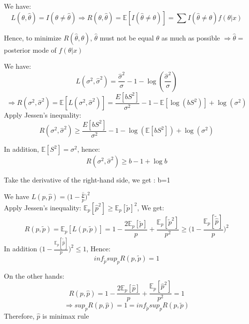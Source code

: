 \documentclass[10pt]{article}
\newenvironment{problem}[2][Problem]{\begin{trivlist}
\item[\hskip \labelsep {\bfseries #1}\hskip \labelsep {\bfseries #2.}]}{\end{trivlist}}
\begin{document}
\begin{problem}{3}
 
We have:
\[L(\theta, \hat{\theta})= I(\theta \neq \hat{\theta}) \Rightarrow R(\theta, \hat{\theta})= \mathbb{E}[I(\hat{\theta} \neq \theta)]= \sum I(\hat{\theta} \neq \theta)f(\theta | x)\]

Hence, to minimize $R(\hat{\theta}, \theta)$,  $\hat{\theta} $ must not be equal $\theta$ as much as possible $\Rightarrow \hat{\theta}=$ posterior mode of $f(\theta| x)$ 


\end{problem}

\begin{problem}{4}


We have:
\[L(\sigma ^2, \hat{\sigma} ^2)=\frac{\hat{\sigma} ^2}{\sigma} -1- \log(\frac{\hat{\sigma} ^2}{\sigma})\]
\[\Rightarrow R(\sigma ^2, \hat{\sigma} ^2)= \mathbb{E}[L(\sigma ^2, \hat{\sigma} ^2)]=\frac{E[bS^2]}{\sigma ^2}-1-\mathbb{E}[\log (bS^2)]+ \log(\sigma ^2)\]
Apply Jessen's inequality:
\[R(\sigma ^2, \hat{\sigma} ^2) \geq \frac{E[bS^2]}{\sigma ^2}-1-\log (\mathbb{E}[bS^2] )+ \log(\sigma ^2)\]

In addition, $\mathbb{E}[S^2]= \sigma ^2$, hence:
\[R(\sigma ^2, \hat{\sigma} ^2) \geq b -1 + \log b \]

Take the derivative of the right-hand side, we get : b=1



\end{problem}


\begin{problem}{5}
We have $L(p, \hat{p})=\big(1-\frac{\hat{p}}{p} \big)^2$ \\
Apply Jessen's inequality: $ \mathbb{E}_p[\hat{p} ^2] \geq {\mathbb{E}_p [\tilde{p}]}^2$, We get:
\[R(p, \tilde{p})=\mathbb{E}_{p}[L(p, \tilde{p})]=1-\frac{2\mathbb{E}_p[\tilde{p}]}{p}+\frac{{\mathbb{E}_p [\tilde{p}^2]}}{p^2} \geq \big(1-\frac{\mathbb{E}_p [\tilde\hat{p}]}{p} \big)^2  \] 
In addition $\big(1-\frac{\mathbb{E}_p [\tilde\hat{p}]}{p} \big)^2  \leq 1 $, Hence:
\[ inf_{\tilde{p}} sup_{p}R(p, \tilde{p})= 1\]

On the other hands:
\[R(p, \hat{p})= 1-\frac{2\mathbb{E}_p[\hat{p}]}{p}+\frac{{\mathbb{E}_p [\hat{p}^2]}}{p^2}=1\]
\[ \Rightarrow sup_{p}R(p, \hat{p})=1= inf_{\tilde{p}} sup_{p}R(p, \tilde{p})\]
Therefore, $\hat{p}$ is minimax rule

\end{problem}
\end{document}
